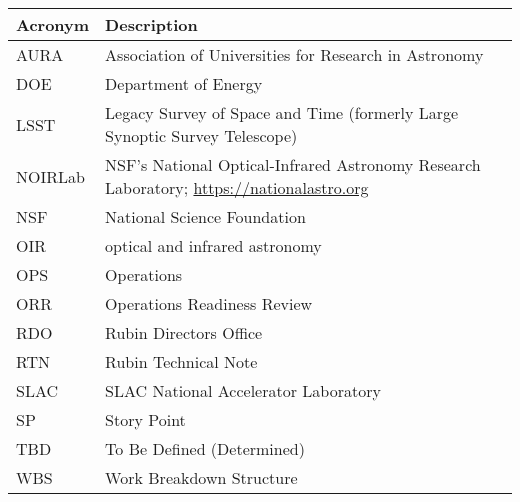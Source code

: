 \addtocounter{table}{-1}
\begin{longtable}{p{}p{}}\hline
\textbf{Acronym} & \textbf{Description}  \\\hline

AURA & Association of Universities for Research in Astronomy \\\hline
DOE & Department of Energy \\\hline
LSST & Legacy Survey of Space and Time (formerly Large Synoptic Survey Telescope) \\\hline
NOIRLab & NSF's National Optical-Infrared Astronomy Research Laboratory; \url{https://nationalastro.org} \\\hline
NSF & National Science Foundation \\\hline
OIR & optical and infrared astronomy \\\hline
OPS & Operations \\\hline
ORR & Operations Readiness Review \\\hline
RDO & Rubin Directors Office \\\hline
RTN & Rubin Technical Note \\\hline
SLAC & SLAC National Accelerator Laboratory \\\hline
SP & Story Point \\\hline
TBD & To Be Defined (Determined) \\\hline
WBS & Work Breakdown Structure \\\hline
\end{longtable}

